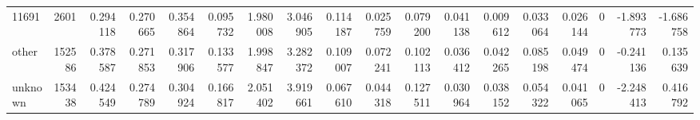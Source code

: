 \begin{tabular}{lrrrrrrrrrrrrrrrrr}
11691 & 2601 & 0.294118 & 0.270665 & 0.354864 & 0.095732 & 1.980008 & 3.046905 & 0.114187 & 0.025759 & 0.079200 & 0.041138 & 0.009612 & 0.033064 & 0.026144 & 0 & -1.893773 & -1.686758 \\
other & 152586 & 0.378587 & 0.271853 & 0.317906 & 0.133577 & 1.998847 & 3.282372 & 0.109007 & 0.072241 & 0.102113 & 0.036412 & 0.042265 & 0.085198 & 0.049474 & 0 & -0.241136 & 0.135639 \\
unknown & 153438 & 0.424549 & 0.274789 & 0.304924 & 0.166817 & 2.051402 & 3.919661 & 0.067610 & 0.044318 & 0.127511 & 0.030964 & 0.038152 & 0.054322 & 0.041065 & 0 & -2.248413 & 0.416792 \\
\bottomrule
\end{tabular}
